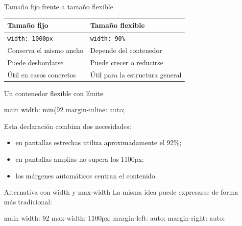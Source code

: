 \documentclass[aspectratio=169,11pt]{beamer}
\begin{document}
    \begin{frame}{Tamaño fijo frente a tamaño flexible}
        \begin{center}
            \small
            \begin{tabular}{p{4.3cm}p{5.3cm}}
                \toprule
                \textbf{Tamaño fijo} & \textbf{Tamaño flexible} \\
                \midrule
                \texttt{width: 1000px} & \texttt{width: 90\%} \\
                Conserva el mismo ancho & Depende del contenedor \\
                Puede desbordarse & Puede crecer o reducirse \\
                Útil en casos concretos & Útil para la estructura general \\
                \bottomrule
            \end{tabular}
        \end{center}

    \end{frame}

    \begin{frame}[fragile]{Un contenedor flexible con límite}
        \begin{csscodedark}
            main {
                width: min(92%
                margin-inline: auto;
            }
        \end{csscodedark}

        Esta declaración combina dos necesidades:

        \begin{itemize}
            \item en pantallas estrechas utiliza aproximadamente el 92\%;
            \item en pantallas amplias no supera los 1100px;
            \item los márgenes automáticos centran el contenido.
        \end{itemize}

    \end{frame}

    \begin{frame}[fragile]{Alternativa con width y max-width}
        La misma idea puede expresarse de forma más tradicional:

        \begin{csscodedark}
            main {
                width: 92%
                max-width: 1100px;
                margin-left: auto;
                margin-right: auto;
            }
        \end{csscodedark}

    \end{frame}
\end{document}
